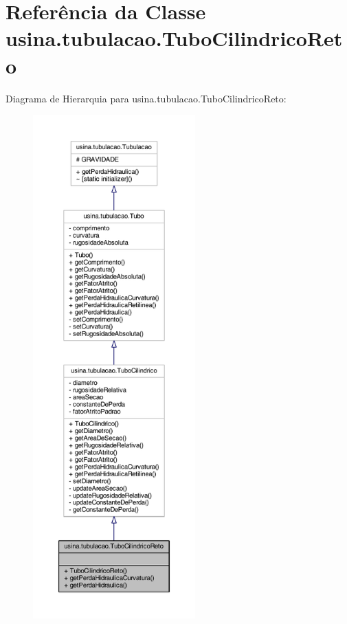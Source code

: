\hypertarget{classusina_1_1tubulacao_1_1_tubo_cilindrico_reto}{\section{Referência da Classe usina.\-tubulacao.\-Tubo\-Cilindrico\-Reto}
\label{classusina_1_1tubulacao_1_1_tubo_cilindrico_reto}
}


Diagrama de Hierarquia para usina.\-tubulacao.\-Tubo\-Cilindrico\-Reto\-:\nopagebreak
\begin{figure}[H]
\begin{center}
\leavevmode
\includegraphics[height=550pt]{classusina_1_1tubulacao_1_1_tubo_cilindrico_reto__inherit__graph}
\end{center}
\end{figure}


